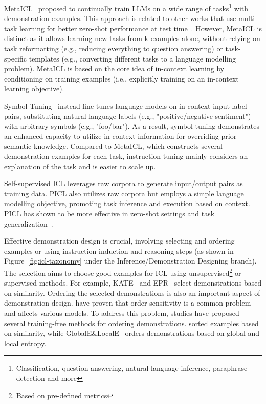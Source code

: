 MetaICL~\cite{min2022metaicl} proposed to continually train LLMs on a wide range of tasks\footnote{Classification, question answering, natural language inference, paraphrase detection and more} with demonstration examples.
This approach is related to other works that use multi-task learning for better zero-shot performance at test time~\cite{min2022metaicl}.
However, MetaICL is distinct as it allows learning new tasks from k examples alone, without relying on task reformatting (e.g., reducing everything to question answering) or task-specific templates (e.g., converting different tasks to a language modelling problem).
MetaICL is based on the core idea of in-context learning by conditioning on training examples (i.e., explicitly training on an in-context learning objective).

Symbol Tuning~\cite{wei2023symbol} instead fine-tunes language models on in-context input-label pairs, substituting natural language labels (e.g., "positive/negative sentiment") with arbitrary symbols (e.g., "foo/bar").
As a result, symbol tuning demonstrates an enhanced capacity to utilize in-context information for overriding prior semantic knowledge.
Compared to MetaICL, which constructs several demonstration examples for each task, instruction tuning mainly considers an explanation of the task and is easier to scale up.

Self-supervised ICL leverages raw corpora to generate input/output pairs as training data.
PICL also utilizes raw corpora but employs a simple language modelling objective, promoting task inference and execution based on context.
PICL has shown to be more effective in zero-shot settings and task generalization~\cite{dong2023survey}.

Effective demonstration design is crucial, involving selecting and ordering examples or using instruction induction and reasoning steps (as shown in Figure~\ref{fig:icl-taxonomy} under the Inference/Demonstration Designing branch).
The selection aims to choose good examples for ICL using unsupervised\footnote{Based on pre-defined metrics} or supervised methods.
For example, KATE~\cite{liu2022good} and EPR~\cite{rubin2022learning} select demonstrations based on similarity.
Ordering the selected demonstrations is also an important aspect of demonstration design.
\textcite{lu2022fantastically} have proven that order sensitivity is a common problem and affects various models.
To address this problem, studies have proposed several training-free methods for ordering demonstrations.
\textcite{liu2022good} sorted examples based on similarity, while GlobalE\&LocalE~\cite{lu2022fantastically} orders demonstrations based on global and local entropy.

